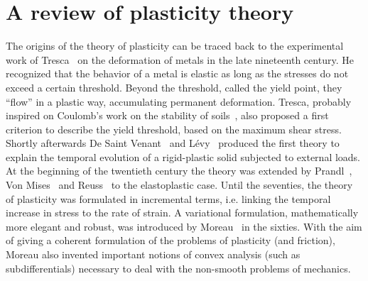 \documentclass[a4paper,10pt,oneside]{amsbook}
\numberwithin{section}{chapter}
\numberwithin{equation}{chapter}
\theoremstyle{definition}
\begin{document}
\section{A review of plasticity theory}
\label{sec:plasticity-review}


The origins of the theory of plasticity can be traced back to the experimental work of Tresca~\cite{Tresca1872} on the deformation of metals in the late nineteenth century. He recognized that the behavior of a metal is elastic as long as the stresses do not exceed a certain threshold. Beyond the threshold, called the yield point, they ``flow'' in a plastic way, accumulating permanent deformation. Tresca, probably inspired on Coulomb's work on the stability of soils~\cite{Coulomb1776}, also proposed a first criterion to describe the yield threshold, based on the maximum shear stress. Shortly afterwards De Saint Venant~\cite{SaintVenant1871} and Lévy~\cite{Levy1871} produced the first theory to explain the temporal evolution of a rigid-plastic solid subjected to external loads. At the beginning of the twentieth century the theory was extended by Prandl~\cite{Prandtl1924}, Von Mises~\cite{vonMises1928} and Reuss~\cite{Reuss1939} to the elastoplastic case. Until the seventies, the theory of plasticity was formulated in incremental terms, i.e. linking the temporal increase in stress to the rate of strain. A variational formulation, mathematically more elegant and robust, was introduced by Moreau~\cite{Moreau1974} in the sixties. With the aim of giving a coherent formulation of the problems of plasticity (and friction), Moreau also invented important notions of convex analysis (such as subdifferentials) necessary to deal with the non-smooth problems of mechanics.
\end{document}
